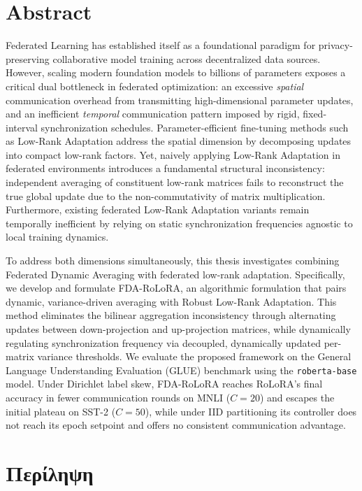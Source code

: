 \chapter*{Abstract}

Federated Learning has established itself as a foundational paradigm for privacy-preserving collaborative model training across decentralized data sources. However, scaling modern foundation models to billions of parameters exposes a critical dual bottleneck in federated optimization: an excessive \emph{spatial} communication overhead from transmitting high-dimensional parameter updates, and an inefficient \emph{temporal} communication pattern imposed by rigid, fixed-interval synchronization schedules. Parameter-efficient fine-tuning methods such as Low-Rank Adaptation address the spatial dimension by decomposing updates into compact low-rank factors. Yet, naively applying Low-Rank Adaptation in federated environments introduces a fundamental structural inconsistency: independent averaging of constituent low-rank matrices fails to reconstruct the true global update due to the non-commutativity of matrix multiplication. Furthermore, existing federated Low-Rank Adaptation variants remain temporally inefficient by relying on static synchronization frequencies agnostic to local training dynamics.

To address both dimensions simultaneously, this thesis investigates combining Federated Dynamic Averaging with federated low-rank adaptation. Specifically, we develop and formulate FDA-RoLoRA, an algorithmic formulation that pairs dynamic, variance-driven averaging with Robust Low-Rank Adaptation. This method eliminates the bilinear aggregation inconsistency through alternating updates between down-projection and up-projection matrices, while dynamically regulating synchronization frequency via decoupled, dynamically updated per-matrix variance thresholds. We evaluate the proposed framework on the General Language Understanding Evaluation (GLUE) benchmark using the \texttt{roberta-base} model. Under Dirichlet label skew, FDA-RoLoRA reaches RoLoRA's final accuracy in fewer communication rounds on MNLI ($C=20$) and escapes the initial plateau on SST-2 ($C=50$), while under IID partitioning its controller does not reach its epoch setpoint and offers no consistent communication advantage.

\cleardoublepage

\chapter*{Περίληψη}


